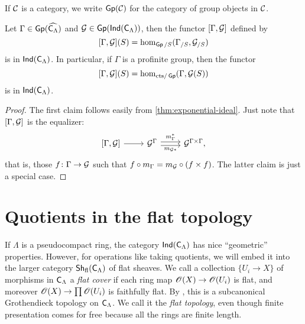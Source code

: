 \documentclass[phd,cornellheadings,draft]{cornell}
\begin{document}
If $\mathcal{C}$ is a category, we write $\operatorname{\mathsf{Gp}}(\mathcal{C})$ for the category of group 
objects in $\mathcal{C}$. 

\begin{corollary}\label{thm:framed-deformation}
Let $\Gamma\in \operatorname{\mathsf{Gp}}(\widehat{\mathsf{C}_\Lambda})$ and 
$\mathcal{G}\in \operatorname{\mathsf{Gp}}(\operatorname{\mathsf{Ind}}(\mathsf{C}_\Lambda))$, then the functor 
$[\Gamma,\mathcal{G}]$ defined by 
\[
	[\Gamma,\mathcal{G}](S) = \hom_{\operatorname{\mathsf{Gp}}/S}(\Gamma_{/S},\mathcal{G}_{/S}) 
\]
is in $\operatorname{\mathsf{Ind}}(\mathsf{C}_\Lambda)$. In particular, if $\Gamma$ is a 
profinite group, then the functor 
\[
	[\Gamma,\mathcal{G}](S) = \hom_{\mathrm{cts}/\operatorname{\mathsf{Gp}}}(\Gamma,\mathcal{G}(S))
\]
is in $\operatorname{\mathsf{Ind}}(\mathsf{C}_\Lambda)$. 
\end{corollary}
\begin{proof}
The first claim follows easily from \ref{thm:exponential-ideal}. Just note 
that $[\Gamma,\mathcal{G}]$ is the equalizer:
\[
\begin{tikzcd}
	{[\Gamma,\cG]} \ar[r]
		& \cG^\Gamma \ar[r, "m_\Gamma^\ast", shift left=.5ex] \ar[r, "m_{\cG\ast}"', shift right=.5ex]
		& \cG^{\Gamma\times \Gamma} ,
\end{tikzcd}
\]
that is, those $f\colon \Gamma\to \mathcal{G}$ such that 
$f\circ m_\Gamma = m_{\mathcal{G}}\circ(f\times f)$. The latter claim is just 
a special case. 
\end{proof}





\section{Quotients in the flat topology}

If $\Lambda$ is a pseudocompact ring, the category 
$\operatorname{\mathsf{Ind}}(\mathsf{C}_\Lambda)$ has nice ``geometric'' properties. However, 
for operations like taking quotients, we will embed it into the larger category 
$\operatorname{\mathsf{Sh}}_{\mathrm{fl}}(\mathsf{C}_\Lambda)$ of flat sheaves. We call a collection 
$\{U_i\to X\}$ of morphisms in $\mathsf{C}_\Lambda$ a \emph{flat cover} if each 
ring map $\mathscr{O}(X)\to \mathscr{O}(U_i)$ is flat, and moreover 
$\mathscr{O}(X)\to \prod \mathscr{O}(U_i)$ is faithfully flat. By \cite[IV 6.3.1]{sga3-1}, this 
is a subcanonical Grothendieck topology on $\mathsf{C}_\Lambda$. We call it the 
\emph{flat topology}, even though finite presentation comes for free because 
all the rings are finite length. 
\end{document}
